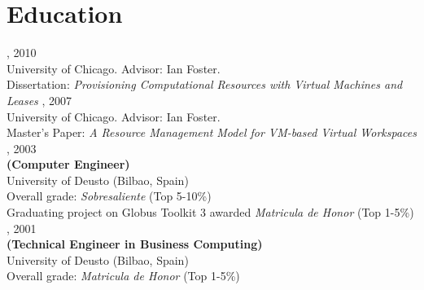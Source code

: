 \documentclass{resume}
\author{Borja Sotomayor}
\begin{document}
\maketitle	

\section*{\hspace{-1cm}Education}
\begin{category}{}
, 2010\\
University of Chicago. Advisor: Ian Foster.\\
Dissertation: \emph{Provisioning Computational Resources with Virtual Machines and Leases} 
, 2007\\
University of Chicago. Advisor: Ian Foster.\\
Master's Paper: \emph{A Resource Management Model for VM-based Virtual Workspaces} 
, 2003\\
\textbf{(Computer Engineer)}\\
University of Deusto (Bilbao, Spain)\\
Overall grade: \emph{Sobresaliente} (Top 5-10\%)\\
Graduating project on Globus Toolkit 3 awarded \emph{Matricula de Honor} (Top 1-5\%)  
, 2001\\
\textbf{(Technical Engineer in Business Computing)}\\
University of Deusto (Bilbao, Spain)\\
Overall grade: \emph{Matricula de Honor} (Top 1-5\%)\\
\end{category}
\end{document}
